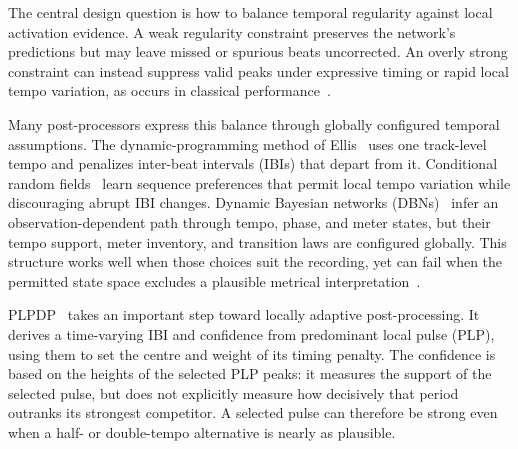 \documentclass{article}
\begin{document}
The central design question is how to balance temporal regularity against local activation evidence. A weak regularity constraint preserves the network's predictions but may leave missed or spurious beats uncorrected. An overly strong constraint can instead suppress valid peaks under expressive timing or rapid local tempo variation, as occurs in classical performance~\cite{Schreiber2020LocalTempo}.

Many post-processors express this balance through globally configured temporal assumptions. The dynamic-programming method of Ellis~\cite{ellis2007beattracking} uses one track-level tempo and penalizes inter-beat intervals (IBIs) that depart from it. Conditional random fields~\cite{fillon2015crf,fuentes2019skipchain} learn sequence preferences that permit local tempo variation while discouraging abrupt IBI changes. Dynamic Bayesian networks (DBNs)~\cite{krebs2015dbn,bock2016joint} infer an observation-dependent path through tempo, phase, and meter states, but their tempo support, meter inventory, and transition laws are configured globally. This structure works well when those choices suit the recording, yet can fail when the permitted state space excludes a plausible metrical interpretation~\cite{ahn2026smcblindspot}.

PLPDP~\cite{chiu2023localperiodicity} takes an important step toward locally adaptive post-processing. It derives a time-varying IBI and confidence from predominant local pulse (PLP), using them to set the centre and weight of its timing penalty. The confidence is based on the heights of the selected PLP peaks: it measures the support of the selected pulse, but does not explicitly measure how decisively that period outranks its strongest competitor. A selected pulse can therefore be strong even when a half- or double-tempo alternative is nearly as plausible.
\end{document}
